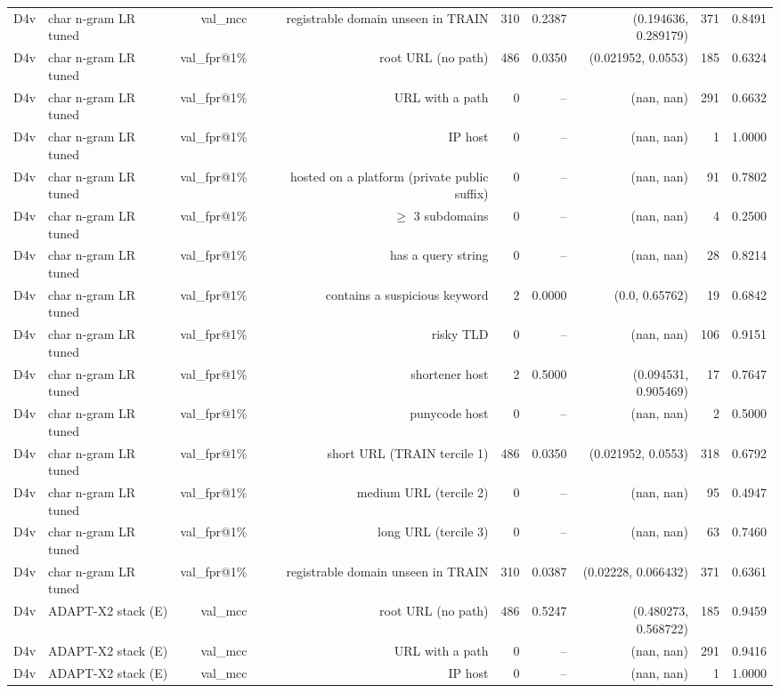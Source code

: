 \begin{table}[t]
\begin{tabular}{llrrrrrrr}
D4v & char n-gram LR tuned & val\_mcc & registrable domain unseen in TRAIN & 310 & 0.2387 & (0.194636, 0.289179) & 371 & 0.8491 \\
D4v & char n-gram LR tuned & val\_fpr@1\% & root URL (no path) & 486 & 0.0350 & (0.021952, 0.0553) & 185 & 0.6324 \\
D4v & char n-gram LR tuned & val\_fpr@1\% & URL with a path & 0 & -- & (nan, nan) & 291 & 0.6632 \\
D4v & char n-gram LR tuned & val\_fpr@1\% & IP host & 0 & -- & (nan, nan) & 1 & 1.0000 \\
D4v & char n-gram LR tuned & val\_fpr@1\% & hosted on a platform (private public suffix) & 0 & -- & (nan, nan) & 91 & 0.7802 \\
D4v & char n-gram LR tuned & val\_fpr@1\% & $\geq$ 3 subdomains & 0 & -- & (nan, nan) & 4 & 0.2500 \\
D4v & char n-gram LR tuned & val\_fpr@1\% & has a query string & 0 & -- & (nan, nan) & 28 & 0.8214 \\
D4v & char n-gram LR tuned & val\_fpr@1\% & contains a suspicious keyword & 2 & 0.0000 & (0.0, 0.65762) & 19 & 0.6842 \\
D4v & char n-gram LR tuned & val\_fpr@1\% & risky TLD & 0 & -- & (nan, nan) & 106 & 0.9151 \\
D4v & char n-gram LR tuned & val\_fpr@1\% & shortener host & 2 & 0.5000 & (0.094531, 0.905469) & 17 & 0.7647 \\
D4v & char n-gram LR tuned & val\_fpr@1\% & punycode host & 0 & -- & (nan, nan) & 2 & 0.5000 \\
D4v & char n-gram LR tuned & val\_fpr@1\% & short URL (TRAIN tercile 1) & 486 & 0.0350 & (0.021952, 0.0553) & 318 & 0.6792 \\
D4v & char n-gram LR tuned & val\_fpr@1\% & medium URL (tercile 2) & 0 & -- & (nan, nan) & 95 & 0.4947 \\
D4v & char n-gram LR tuned & val\_fpr@1\% & long URL (tercile 3) & 0 & -- & (nan, nan) & 63 & 0.7460 \\
D4v & char n-gram LR tuned & val\_fpr@1\% & registrable domain unseen in TRAIN & 310 & 0.0387 & (0.02228, 0.066432) & 371 & 0.6361 \\
D4v & ADAPT-X2 stack (E) & val\_mcc & root URL (no path) & 486 & 0.5247 & (0.480273, 0.568722) & 185 & 0.9459 \\
D4v & ADAPT-X2 stack (E) & val\_mcc & URL with a path & 0 & -- & (nan, nan) & 291 & 0.9416 \\
D4v & ADAPT-X2 stack (E) & val\_mcc & IP host & 0 & -- & (nan, nan) & 1 & 1.0000 \\

\end{tabular}
\end{table}
